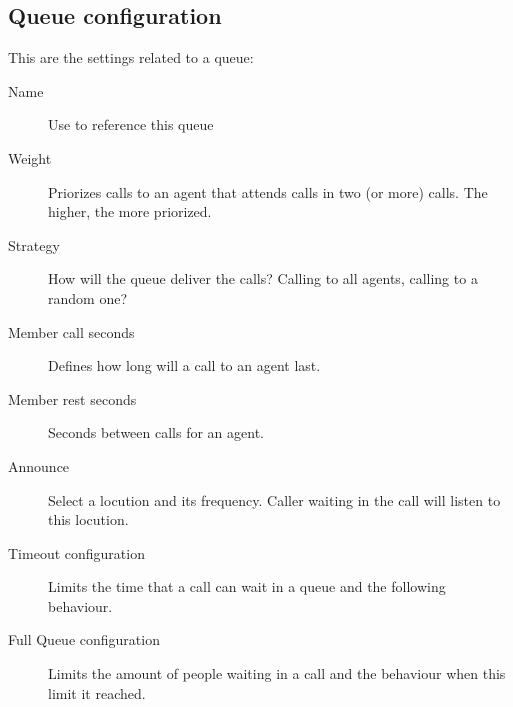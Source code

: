 \documentclass[letterpaper,10pt,english]{sphinxmanual}
\begin{document}
\subsection{Queue configuration}
\label{pbx_features/queues:queue-configuration}
This are the settings related to a queue:
\begin{description}
\item[{Name}] \leavevmode{}\label{pbx_features/queues:term-name}
Use to reference this queue

\item[{Weight}] \leavevmode{}\label{pbx_features/queues:term-weight}
Priorizes calls to an agent that attends calls in two (or more) calls. The
higher, the more priorized.

\item[{Strategy}] \leavevmode{}\label{pbx_features/queues:term-strategy}
How will the queue deliver the calls? Calling to all agents, calling to a
random one?

\item[{Member call seconds}] \leavevmode{}\label{pbx_features/queues:term-member-call-seconds}
Defines how long will a call to an agent last.

\item[{Member rest seconds}] \leavevmode{}\label{pbx_features/queues:term-member-rest-seconds}
Seconds between calls for an agent.

\item[{Announce}] \leavevmode{}\label{pbx_features/queues:term-announce}
Select a locution and its frequency. Caller waiting in the call will listen
to this locution.

\item[{Timeout configuration}] \leavevmode{}\label{pbx_features/queues:term-timeout-configuration}
Limits the time that a call can wait in a queue and the following behaviour.

\item[{Full Queue configuration}] \leavevmode{}\label{pbx_features/queues:term-full-queue-configuration}
Limits the amount of people waiting in a call and the behaviour when this limit
it reached.

\end{description}
\end{document}
